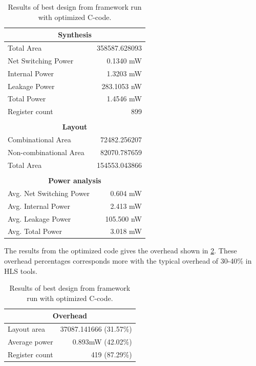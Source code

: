 \begin{table}[hbtp]
    \centering
    \begin{tabular}{lr}
    \multicolumn{2}{c}{\textbf{Synthesis}} \\
    \toprule
    Total Area & 358587.628093 \\
    \hline
    Net Switching Power & 0.1340 mW \\
    Internal Power & 1.3203 mW \\
    Leakage Power & 283.1053 nW \\
    \hline
    Total Power & 1.4546 mW \\
    \hline
    Register count & 899 \\ 
    \bottomrule
    & \\
    \multicolumn{2}{c}{\textbf{Layout}} \\
    \toprule
    Combinational Area & 72482.256207 \\
    Non-combinational Area & 82070.787659 \\
    \hline
    Total Area & 154553.043866 \\
    \bottomrule
    & \\
    \multicolumn{2}{c}{\textbf{Power analysis}} \\
    \toprule
    Avg. Net Switching Power & 0.604 mW \\
    Avg. Internal Power & 2.413 mW \\
    Avg. Leakage Power & 105.500 nW \\
    \hline
    Avg. Total Power & 3.018 mW \\
    \bottomrule
    \end{tabular}
    \caption{Results of best design from framework run with optimized C-code.}
    \label{tab:resultsframeworkrun3}
\end{table}
The results from the optimized code gives the overhead shown in \cref{tab:overheadframeworkrun3}. These overhead percentages corresponds more with the typical overhead of 30-40\% in HLS tools.
\begin{table}[hbtp]
    \centering
    \begin{tabular}{lr}
    \multicolumn{2}{c}{\textbf{Overhead}} \\
    \toprule
    Layout area & 37087.141666 (31.57\%) \\
    Average power & 0.893mW (42.02\%) \\
    Register count & 419 (87.29\%) \\
    \bottomrule
    \end{tabular}
    \caption{Results of best design from framework run with optimized C-code.}
    \label{tab:overheadframeworkrun3}
\end{table}

